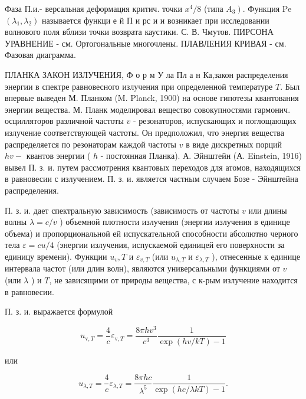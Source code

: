\documentclass[10pt]{article}
\begin{document}
Фаза П.и.- версальная деформация критич. точки $x^{4} / 8$ (типа $\left.A_{3}\right)$. Функция Pe $\left(\lambda_{1}, \lambda_{2}\right)$ называется функци е й П и рс и и возникает при исследовании волнового поля вблизи точки возврата каустики. С. В. Чмутов. ПИРСОНА УРАВНЕНИЕ - см. Ортогональные многочлены. ПЛАВЛЕНИЯ КРИВАЯ - см. Фазовая диаграмма.



ПЛАНКА ЗАКОН ИЗЛУЧЕНИЯ, Ф о р м У ла Пл а н Ка,закон распределения энергии в спектре равновесного излучения при определенной температуре $T$. Был впервые выведен М. Планком (M. Planck, 1900) на основе гипотезы квантования энергии вещества. М. Планк моделировал вещество совокупностями гармонич. осцилляторов различной частоты $v$ - резонаторов, испускающих и поглощающих излучение соответствующей частоты. Он предположил, что энергия вещества распределяется по резонаторам каждой частоты $v$ в виде дискретных порций $h v-$ квантов энергии ( $h$ - постоянная Планка). А. Эйнштейн (А. Einstein, 1916) вывел П. з. и. путем рассмотрения квантовых переходов для атомов, находящихся в равновесии с излучением. П. з. и. является частным случаем Бозе - Эйнштейна распределения.



П. з. и. дает спектральную зависимость (зависимость от частоты $v$ или длины волны $\lambda=c / v$ ) объемной плотности излучения (энергии излучения в единице объема) и пропорциональной ей испускательной способности абсолютно черного тела $\varepsilon=c u / 4$ (энергии излучения, испускаемой единицей его поверхности за единицу времени). Функции $u_{v}, T$ и $\varepsilon_{v, T}$ (или $u_{\lambda, T}$ и $\varepsilon_{\lambda, T}$ ), отнесенные к единице интервала частот (или длин волн), являются универсальными функциями от $v$ (или $\lambda$ ) и $T$, не зависящими от природы вещества, с к-рым излучение находится в равновесии.



П. з. и. выражается формулой



\[

u_{\mathrm{v}, T}=\frac{4}{c} \varepsilon_{\mathrm{v}, T}=\frac{8 \pi h v^{3}}{c^{3}} \frac{1}{\exp (h v / k T)-1}

\]



или



\[

u_{\lambda, T}=\frac{4}{c} \varepsilon_{\lambda, T}=\frac{8 \pi h c}{\lambda^{5}} \frac{1}{\exp (h c / \lambda k T)-1} .

\]
\end{document}
